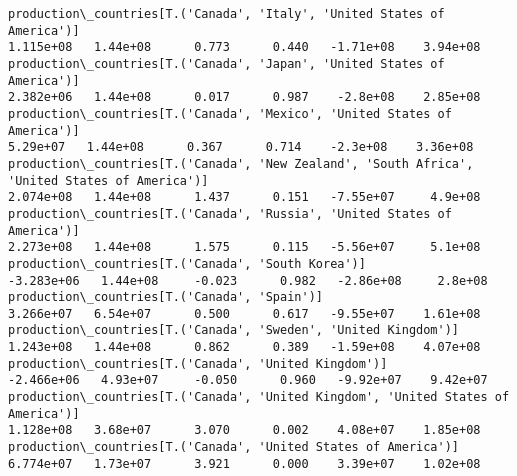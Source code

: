 \documentclass[11pt]{article}
\begin{document}
\begin{Verbatim}[commandchars=\\\{\}]
production\_countries[T.('Canada', 'Italy', 'United States of America')]                                                                                                                1.115e+08   1.44e+08      0.773      0.440   -1.71e+08    3.94e+08
production\_countries[T.('Canada', 'Japan', 'United States of America')]                                                                                                                2.382e+06   1.44e+08      0.017      0.987    -2.8e+08    2.85e+08
production\_countries[T.('Canada', 'Mexico', 'United States of America')]                                                                                                                5.29e+07   1.44e+08      0.367      0.714    -2.3e+08    3.36e+08
production\_countries[T.('Canada', 'New Zealand', 'South Africa', 'United States of America')]                                                                                          2.074e+08   1.44e+08      1.437      0.151   -7.55e+07     4.9e+08
production\_countries[T.('Canada', 'Russia', 'United States of America')]                                                                                                               2.273e+08   1.44e+08      1.575      0.115   -5.56e+07     5.1e+08
production\_countries[T.('Canada', 'South Korea')]                                                                                                                                     -3.283e+06   1.44e+08     -0.023      0.982   -2.86e+08     2.8e+08
production\_countries[T.('Canada', 'Spain')]                                                                                                                                            3.266e+07   6.54e+07      0.500      0.617   -9.55e+07    1.61e+08
production\_countries[T.('Canada', 'Sweden', 'United Kingdom')]                                                                                                                         1.243e+08   1.44e+08      0.862      0.389   -1.59e+08    4.07e+08
production\_countries[T.('Canada', 'United Kingdom')]                                                                                                                                  -2.466e+06   4.93e+07     -0.050      0.960   -9.92e+07    9.42e+07
production\_countries[T.('Canada', 'United Kingdom', 'United States of America')]                                                                                                       1.128e+08   3.68e+07      3.070      0.002    4.08e+07    1.85e+08
production\_countries[T.('Canada', 'United States of America')]                                                                                                                         6.774e+07   1.73e+07      3.921      0.000    3.39e+07    1.02e+08

\end{Verbatim}
\end{document}
